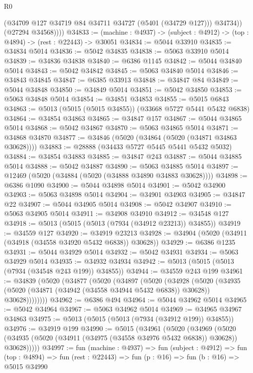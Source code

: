 \begin{lexlean}{R0}
\begin{coremodule}
              (@34709 @127 @34719 @84 @34711 @34727 (@5401 (@34729 @127)))
              @34734))
          (@27294 @34568))))
@34833 := (machine : @4937) -> (subject : @4912) -> (top : @4894) -> (rest : @22443) -> @30051
@34834 := @5044 @33910
@34835 := @34834 @5014
@34836 := @5042 @34835
@34838 := @5063 @33910 @5014
@34839 := @34836 @34838
@34840 := @6386 @1145
@34842 := @5044 @34840 @5014
@34843 := @5042 @34842
@34845 := @5063 @34840 @5014
@34846 := @34843 @34845
@34847 := @6385 @33913
@34848 := @34847 @84
@34849 := @5044 @34848
@34850 := @34849 @5014
@34851 := @5042 @34850
@34853 := @5063 @34848 @5014
@34854 := @34851 @34853
@34855 := @5015 @6843
@34863 := @5013 (@5015 (@5015 @34855)) (@33668 @5727 @5441 @5432 @6838)
@34864 := @34854 @34863
@34865 := @34847 @157
@34867 := @5044 @34865 @5014
@34868 := @5042 @34867
@34870 := @5063 @34865 @5014
@34871 := @34868 @34870
@34877 := @34846 (@5020 (@34864 (@5020 (@34871 @34863 @30628))))
@34883 := @28888 (@34433 @5727 @5445 @5441 @5432 @5032)
@34884 := @34854 @34883
@34885 := @34847 @243
@34887 := @5044 @34885 @5014
@34888 := @5042 @34887
@34890 := @5063 @34885 @5014
@34897 := @12469 (@5020 (@34884 (@5020 (@34888 @34890 @34883 @30628))))
@34898 := @6386 @1090
@34900 := @5044 @34898 @5014
@34901 := @5042 @34900
@34903 := @5063 @34898 @5014
@34904 := @34901 @34903
@34905 := @34847 @22
@34907 := @5044 @34905 @5014
@34908 := @5042 @34907
@34910 := @5063 @34905 @5014
@34911 := @34908 @34910
@34912 := @34548 @127
@34918 := @5013 (@5015 (@5013 (@7934 (@34912 @23213)) @34855))
@34919 := @34559 @127
@34920 := @34919 @23213
@34928 := @34904 (@5020 (@34911 (@34918 (@34558 @34920 @5432 @6838)) @30628))
@34929 := @6386 @1235
@34931 := @5044 @34929 @5014
@34932 := @5042 @34931
@34934 := @5063 @34929 @5014
@34935 := @34932 @34934
@34942 := @5013 (@5015 (@5013 (@7934 (@34548 @243 @199)) @34855))
@34944 := @34559 @243 @199
@34961 := @34839
    (@5020
      (@34877
        (@5020
          (@34897
            (@5020
              (@34928
                (@5020
                  (@34935
                    (@5020 (@34871 (@34942 (@34558 @34944 @5432 @6838)) @30628))
                    @30628))))))))
@34962 := @6386 @494
@34964 := @5044 @34962 @5014
@34965 := @5042 @34964
@34967 := @5063 @34962 @5014
@34969 := @34965 @34967 @34863
@34975 := @5013 (@5015 (@5013 (@7934 (@34912 @199)) @34855))
@34976 := @34919 @199
@34990 := @5015
    (@34961
      (@5020
        (@34969
          (@5020 (@34935 (@5020 (@34911 (@34975 (@34558 @34976 @5432 @6838)) @30628)) @30628)))))
@34997 := fun (machine : @4937) =>
  fun (subject : @4912) =>
  fun (top : @4894) => fun (rest : @22443) => fun (p : @16) => fun (b : @16) => @5015 @34990

\end{coremodule}
\end{lexlean}
